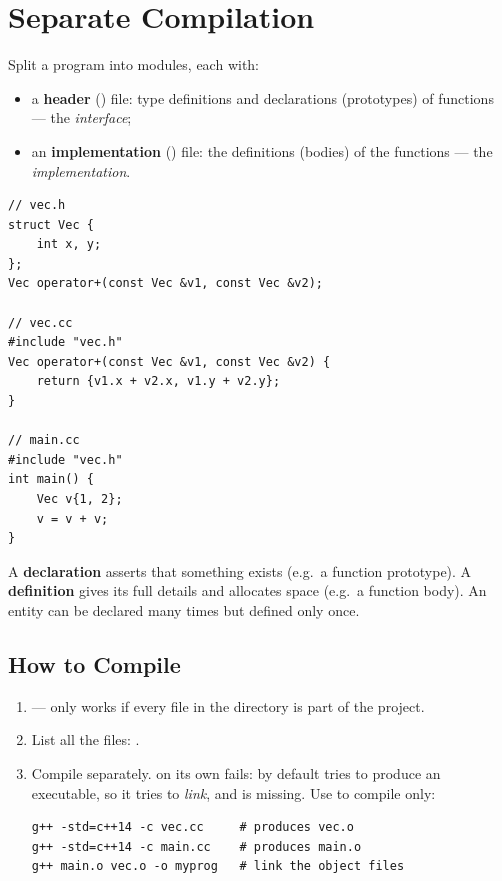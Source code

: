 \section{Separate Compilation}
Split a program into modules, each with:
\begin{itemize}
  \item a \textbf{header} () file: type definitions and declarations
        (prototypes) of functions --- the \emph{interface};
  \item an \textbf{implementation} () file: the definitions
        (bodies) of the functions --- the \emph{implementation}.
\end{itemize}

\begin{lstlisting}[style=cpp]
// vec.h
struct Vec {
    int x, y;
};
Vec operator+(const Vec &v1, const Vec &v2);

// vec.cc
#include "vec.h"
Vec operator+(const Vec &v1, const Vec &v2) {
    return {v1.x + v2.x, v1.y + v2.y};
}

// main.cc
#include "vec.h"
int main() {
    Vec v{1, 2};
    v = v + v;
}
\end{lstlisting}

\begin{definition}
A \textbf{declaration} asserts that something exists (e.g.\ a function
prototype). A \textbf{definition} gives its full details and allocates space
(e.g.\ a function body). An entity can be declared many times but defined only
once.
\end{definition}

\subsection{How to Compile}
\begin{enumerate}
  \item {} --- only works if every  file in the
        directory is part of the project.
  \item List all the files: .
  \item Compile separately.  on its own fails: by default
         tries to produce an executable, so it tries to \emph{link},
        and  is missing. Use  to compile only:
\begin{lstlisting}[style=bash]
g++ -std=c++14 -c vec.cc     # produces vec.o
g++ -std=c++14 -c main.cc    # produces main.o
g++ main.o vec.o -o myprog   # link the object files
\end{lstlisting}
\end{enumerate}

